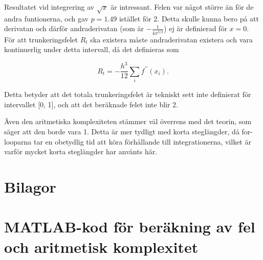 \documentclass[a4paper,titlepage]{article}
\begin{document}
Resultatet vid integrering av $\sqrt x$ är intressant. Felen var något större än för
de andra funtionerna, och gav $p = 1.49$ istället för 2. Detta skulle kunna
bero på att derivatan och därför andraderivatan (som är $-\frac{1}{4x^{3/2}}$)
ej är definierad för $x=0$. För att trunkeringsfelet $R_t$ ska existera måste
andraderivatan existera och vara kontinuerlig under detta intervall, då det
definieras som

$$
    R_t = -\frac{h^3}{12}\sum_if^{\prime\prime}(x_i).
$$

Detta betyder att det totala trunkeringsfelet är tekniskt sett inte definierat
för intervallet [0, 1], och att det beräknade felet inte blir 2.


Även den aritmetiska komplexiteten stämmer väl överrens med det teorin, som säger att
den borde vara 1. Detta är mer tydligt med korta steglängder, då
for-looparna tar en obetydlig tid att köra förhållande till integrationerna,
vilket är varför mycket korta steglängder har använts här.


\section*{Bilagor}
\appendix

\section{MATLAB-kod för beräkning av fel och aritmetisk komplexitet}
\label{sec:testcode}

\end{document}
